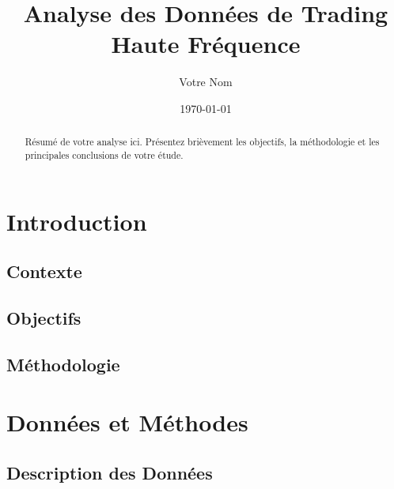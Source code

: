 \documentclass[12pt,a4paper]{article}
\title{\textbf{Analyse des Données de Trading Haute Fréquence}}
\author{Votre Nom}
\date{\today}
\begin{document}
\maketitle

\begin{abstract}
    Résumé de votre analyse ici. Présentez brièvement les objectifs, la méthodologie et les principales conclusions de votre étude.
\end{abstract}

\tableofcontents
\newpage

\section{Introduction}
\subsection{Contexte}
\subsection{Objectifs}
\subsection{Méthodologie}

\section{Données et Méthodes}
\subsection{Description des Données}
\end{document}
